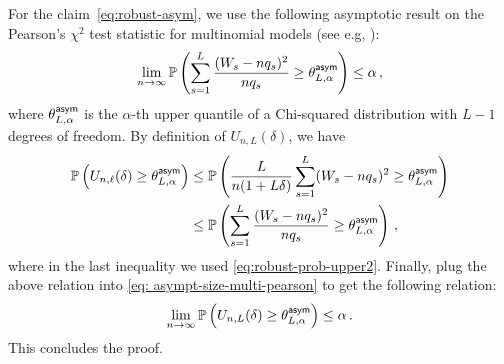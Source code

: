 \documentclass[11pt]{article}
\begin{document}
	 For the claim~\eqref{eq:robust-asym}, we use the following  asymptotic result on the Pearson's $\chi^2$ test statistic for multinomial models (see e.g, \cite[Theorem 14.3.1]{lehmann2006testing}):
	\begin{equation}\label{eq: asympt-size-multi-pearson}
	\lim\limits_{n\rightarrow \infty}^{}{\mathbb P}\left ( \sum\limits_{s=1}^{L}\frac{(W_s-nq_s)^2}{nq_s} \geq \theta^{\mathsf{asym}}_{L,\alpha}  \right) \leq \alpha\,, 
	\end{equation}
where $\theta^{\mathsf{asym}}_{L,\alpha} $ is the $\alpha$-th upper quantile of a Chi-squared distribution with $L-1$ degrees of freedom. By definition of $U_{n,L}(\delta)$, we have
\begin{align*}
{\mathbb P}\left(U_{n,\ell}(\delta) \geq \theta^{\mathsf{asym}}_{L,\alpha}    \right)&\leq 
{\mathbb P}\left(\frac{L}{n(1+L\delta)}\sum\limits_{s=1}^{L} (W_s-nq_s)^2 \geq \theta^{\mathsf{asym}}_{L,\alpha}    \right)\\
&\leq {\mathbb P}\left(\sum\limits_{s=1}^{L} \frac{(W_s-nq_s)^2}{nq_s} \geq \theta^{\mathsf{asym}}_{L,\alpha}    \right)\,,
\end{align*}
where in the last inequality we used \eqref{eq:robust-prob-upper2}. Finally, plug the above relation into \eqref{eq: asympt-size-multi-pearson} to get the following relation:
\[
\lim\limits_{n\rightarrow \infty}^{}{\mathbb P}\left( U_{n,L}(\delta) \geq  \theta^{\mathsf{asym}}_{L,\alpha}   \right) \leq \alpha\,.
\]
This concludes the proof.




\newpage


\end{document}
